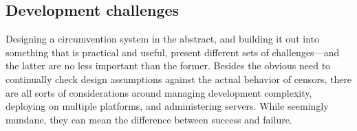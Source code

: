 \documentclass[letterpaper,twocolumn]{article}
\begin{document}
\subsection{Development challenges}
\label{sec:challenges}

Designing a circumvention system in the abstract,
and building it out into something that is practical and useful,
present different sets of challenges---and
the latter are no less important than the former.
Besides the obvious need
to continually check design assumptions
against the actual behavior of censors,
there are all sorts of considerations around
managing development complexity,
deploying on multiple platforms,
and administering servers.
While seemingly mundane, they can mean the difference between success and failure.
\end{document}
